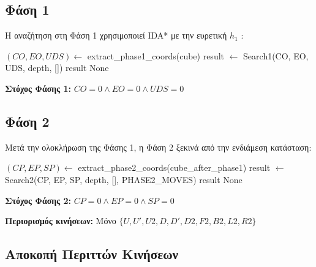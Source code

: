 \subsection{Φάση 1}

Η αναζήτηση στη Φάση 1 χρησιμοποιεί IDA* με την ευρετική $h_1$ \cite{korf1985depth,kociemba_twophase_details}:

\begin{algorithm}[H]
\caption{IDA* Φάσης 1}
\begin{algorithmic}[1]
    \State $(CO, EO, UDS) \gets$ extract\_phase1\_coords(cube)
        \State result $\gets$ Search1(CO, EO, UDS, depth, [])
            \State \Return result
        \EndIf
    \EndFor
    \State \Return None
\EndFunction
\end{algorithmic}
\end{algorithm}

\textbf{Στόχος Φάσης 1:} $CO = 0 \land EO = 0 \land UDS = 0$

\subsection{Φάση 2}

Μετά την ολοκλήρωση της Φάσης 1, η Φάση 2 ξεκινά από την ενδιάμεση κατάσταση:

\begin{algorithm}[H]
\caption{IDA* Φάσης 2}
\begin{algorithmic}[1]
    \State $(CP, EP, SP) \gets$ extract\_phase2\_coords(cube\_after\_phase1)
        \State result $\gets$ Search2(CP, EP, SP, depth, [], PHASE2\_MOVES)
            \State \Return result
        \EndIf
    \EndFor
    \State \Return None
\EndFunction
\end{algorithmic}
\end{algorithm}

\textbf{Στόχος Φάσης 2:} $CP = 0 \land EP = 0 \land SP = 0$

\textbf{Περιορισμός κινήσεων:} Μόνο $\{U, U', U2, D, D', D2, F2, B2, L2, R2\}$

\subsection{Αποκοπή Περιττών Κινήσεων}


